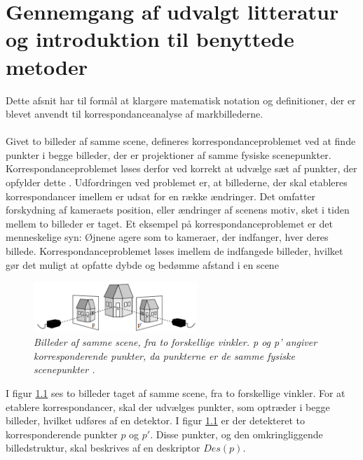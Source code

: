 \chapter{Gennemgang af udvalgt litteratur og introduktion til benyttede metoder} \label{sec:Kor}
Dette afsnit har til formål at klargøre matematisk notation og definitioner, der er blevet anvendt til korrespondanceanalyse af markbillederne.
\\ 
\\

Givet to billeder af samme scene, defineres korrespondanceproblemet ved at finde punkter i begge billeder, der er projektioner af samme fysiske scenepunkter. Korrespondanceproblemet løses derfor ved korrekt at udvælge sæt af punkter, der opfylder dette \cite{Stefano}.  Udfordringen ved problemet er, at billederne, der skal etableres korrespondancer imellem er udsat for en række ændringer. Det omfatter forskydning af kameraets position, eller ændringer af scenens motiv, sket i tiden mellem to billeder er taget. Et eksempel på korrespondanceproblemet er det menneskelige syn: Øjnene agere som to kameraer, der indfanger, hver deres billede. Korrespondanceproblemet løses imellem de indfangede billeder, hvilket gør det muligt at opfatte dybde og bedømme afstand i en scene 
\begin{figure}[H]
    \centering
    \includegraphics[width=0.55\textwidth]{fig/3.png}
     \vspace{-1em}
    \begin{center}    
       \caption{{\footnotesize \textit{Billeder af samme scene, fra to forskellige vinkler. p og p' angiver korresponderende punkter, da punkterne er de samme fysiske scenepunkter \cite{kim}.}}}
    \label{fig:1}
     \end{center}
     \vspace{-2.5em}
  \end{figure} \noindent
I figur \ref{fig:1} ses to billeder taget af samme scene, fra to forskellige vinkler. For at etablere korrespondancer, skal der udvælges punkter, som optræder i begge billeder, hvilket udføres af en detektor. I figur \ref{fig:1} er der detekteret to korresponderende punkter $p$ og $p'$. Disse punkter, og den omkringliggende billedstruktur, skal beskrives af en deskriptor $Des(p)$. %
